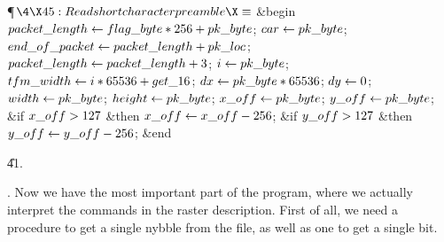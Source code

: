 \Y\P$\4\X45:Read short character preamble\X\S$\6
\&{begin} $\\{packet\_length}\gets\\{flag\_byte}\ast256+\\{pk\_byte}$;\5
$\\{car}\gets\\{pk\_byte}$;\5
$\\{end\_of\_packet}\gets\\{packet\_length}+\\{pk\_loc}$;\5
$\\{packet\_length}\gets\\{packet\_length}+3$;\5
$\hbox{$i$}\gets\\{pk\_byte}$;\5
$\\{tfm\_width}\gets\hbox{$i$}\ast65536+\\{get\_16}$;\5
$\\{dx}\gets\\{pk\_byte}\ast65536$;\5
$\\{dy}\gets0$;\5
$\\{width}\gets\\{pk\_byte}$;\5
$\\{height}\gets\\{pk\_byte}$;\5
$\\{x\_off}\gets\\{pk\_byte}$;\5
$\\{y\_off}\gets\\{pk\_byte}$;\6
\&{if} $\\{x\_off}>127$ \1\&{then}\5
$\\{x\_off}\gets\\{x\_off}-256$;\2\6
\&{if} $\\{y\_off}>127$ \1\&{then}\5
$\\{y\_off}\gets\\{y\_off}-256$;\2\6
\&{end}\par
\U41.\fi

. Now we have the most important part of the program, where we actually
interpret the commands in the raster description.  First of all, we need
a procedure to get a single nybble from the file, as well as one to get
a single bit.

